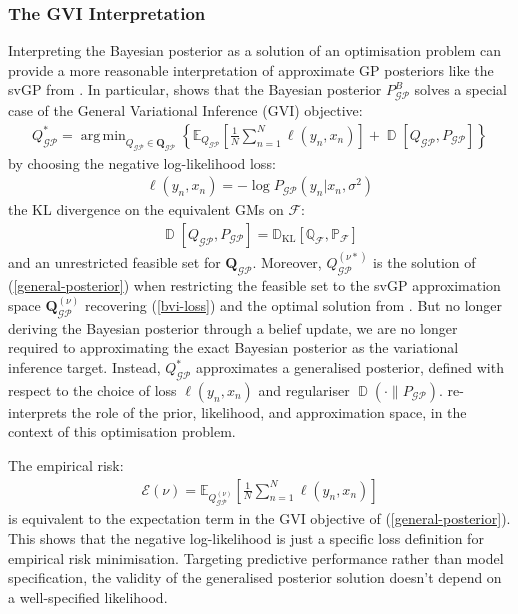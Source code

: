 \documentclass{article}
\newcommand{\KLD}{\operatorname{\mathbb{D}_{KL}}}
\newcommand{\D}{\operatorname{\mathbb{D}}}
\newcommand{\GP}{\operatorname{\mathcal{GP}}}
\DeclareMathOperator*{\argmin}{arg\,min}
\numberwithin{equation}{section}
\begin{document}
\subsubsection{The GVI Interpretation}
Interpreting the Bayesian posterior as a solution of an optimisation problem can provide a more reasonable interpretation of approximate GP posteriors like the svGP from \cite{titsias2009variational}. In particular, \cite{knoblauch2022optimization} shows that the Bayesian posterior $P_{\GP}^B$ solves a special case of the General Variational Inference (GVI) objective:
\begin{align}
Q_{\GP}^* = \argmin_{Q_{\GP} \in \boldsymbol{Q}_{\GP}} \left\{ \mathbb{E}_{Q_{\GP}}\left[\frac{1}{N}\sum_{n=1}^N \ell(y_n, x_n)\right] + \D\left[Q_{\GP}, P_{\GP}\right]\right\}
\label{general-posterior}
\end{align}
by choosing the negative log-likelihood loss:
\begin{align}
    \ell(y_n, x_n) = -\log P_{\GP}\left(y_n \vert x_n, \sigma^2\right)
\end{align}
the KL divergence on the equivalent GMs on $\mathcal{F}$:
\begin{align}
    \D\left[Q_{\GP}, P_{\GP}\right] = \KLD\left[\mathbb{Q}_{\mathcal{F}}, \mathbb{P}_{\mathcal{F}}\right]
\end{align}
and an unrestricted feasible set for $\boldsymbol{Q}_{\GP}$. Moreover, $Q_{\GP}^{(\nu*)}$ is the solution of (\ref{general-posterior}) when restricting the feasible set to the svGP approximation space $\boldsymbol{Q}_{\GP}^{(\nu)}$ recovering (\ref{bvi-loss}) and the optimal solution from \cite{titsias2009variational}. But no longer deriving the Bayesian posterior through a belief update, we are no longer required to approximating the exact Bayesian posterior as the variational inference target. Instead, $Q_{\GP}^*$ approximates a generalised posterior, defined with respect to the choice of loss $\ell(y_n, x_n)$ and regulariser $\D\left(\cdot \| P_{\GP}\right)$.  \cite{knoblauch2022optimization} re-interprets the role of the prior, likelihood, and approximation space, in the context of this optimisation problem.

The empirical risk: 
\begin{align}
\mathcal{E}(\nu) = \mathbb{E}_{Q_{\GP}^{(\nu)}}\left[\frac{1}{N}\sum_{n=1}^N \ell\left(y_n, x_n\right)\right]
\label{empirical-risk}
\end{align}
is equivalent to the expectation term in the GVI objective of (\ref{general-posterior}). This shows that the negative log-likelihood is just a specific loss definition for empirical risk minimisation. Targeting predictive performance rather than model specification, the validity of the generalised posterior solution doesn't depend on a well-specified likelihood.
\end{document}

